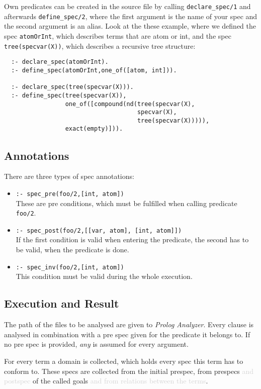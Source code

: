 \documentclass[a4paper]{article}
\newcommand{\prologAnalyzer}{\textit{Prolog Analyzer}}
\begin{document}
Own predicates can be created in the source file by calling \texttt{declare\_spec/1} and afterwards \texttt{define\_spec/2}, where the
first argument is the name of your spec and the second argument is an alias.
Look at the these example, where we defined the spec \texttt{atomOrInt}, which
describes terms that are atom or int, and the spec \texttt{tree(specvar(X))},
which describes a recursive tree structure:
\begin{lstlisting}
  :- declare_spec(atomOrInt).
  :- define_spec(atomOrInt,one_of([atom, int])).

  :- declare_spec(tree(specvar(X))).
  :- define_spec(tree(specvar(X)),
                 one_of([compound(nd(tree(specvar(X),
                                     specvar(X),
                                     tree(specvar(X))))),
                 exact(empty)])).
               \end{lstlisting}

         
\subsection{Annotations}
\label{subsection:annotations}
There are three types of spec annotations:
\begin{itemize}
\item{\texttt{:- spec\_pre(foo/2,[int, atom])}}\hfill\\
  These are pre conditions, which must be fulfilled when calling predicate \texttt{foo/2}.  
\item{\texttt{:- spec\_post(foo/2,[[var, atom], [int, atom]])}}\hfill\\
  If the first condition is valid when entering the predicate, the second has to
  be valid, when the predicate is done.
\item{\texttt{:- spec\_inv(foo/2,[int, atom])}}\hfill\\
  This condition must be valid during the whole execution.
\end{itemize}

\subsection{Execution and Result}
The path of the files to be analysed are given to \prologAnalyzer{}.
Every clause is analysed in combination with a pre spec given for the predicate
it belongs to. If no pre spec is provided, \textit{any} is assumed for every
argument.

For every term a domain is collected, which holds every spec this term has to
conform to. These specs are collected from the initial prespec, from prespecs
\textcolor{lightgray}{and postspec} of the called goals
\textcolor{lightgray}{and from relations between the terms}.
\end{document}
